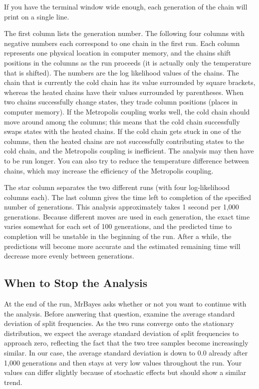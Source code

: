\documentclass[12pt]{book}
\begin{document}
If you have the terminal window wide enough, each generation of the chain will print on a single
line.

The first column lists the generation number. The following four columns with negative numbers each
correspond to one chain in the first run. Each column represents one physical location in computer
memory, and the chains shift positions in the columns as the run proceeds (it is actually only the
temperature that is shifted). The numbers are the log likelihood values of the chains. The chain
that is currently the cold chain has its value surrounded by square brackets, whereas the heated
chains have their values surrounded by parentheses. When two chains successfully change states,
they trade column positions (places in computer memory). If the Metropolis coupling works well, the
cold chain should move around among the columns; this means that the cold chain successfully swaps
states with the heated chains. If the cold chain gets stuck in one of the columns, then the heated
chains are not successfully contributing states to the cold chain, and the Metropolis coupling is
inefficient. The analysis may then have to be run longer. You can also try to reduce the
temperature difference between chains, which may increase the efficiency of the Metropolis
coupling.

The star column separates the two different runs (with four log-likelihood columns each). The last
column gives the time left to completion of the specified number of generations. This analysis
approximately takes 1 second per 1,000 generations. Because different moves are used in each
generation, the exact time varies somewhat for each set of 100 generations, and the predicted time
to completion will be unstable in the beginning of the run. After a while, the predictions will
become more accurate and the estimated remaining time will decrease more evenly between
generations.

\subsection{When to Stop the Analysis}

At the end of the run, MrBayes asks whether or not you want to continue with the analysis. Before
answering that question, examine the average standard deviation of split frequencies. As the two
runs converge onto the stationary distribution, we expect the average standard deviation of split
frequencies to approach zero, reflecting the fact that the two tree samples become increasingly
similar. In our case, the average standard deviation is down to 0.0 already after 1,000 generations
and then stays at very low values throughout the run. Your values can differ slightly because of
stochastic effects but should show a similar trend.
\end{document}
